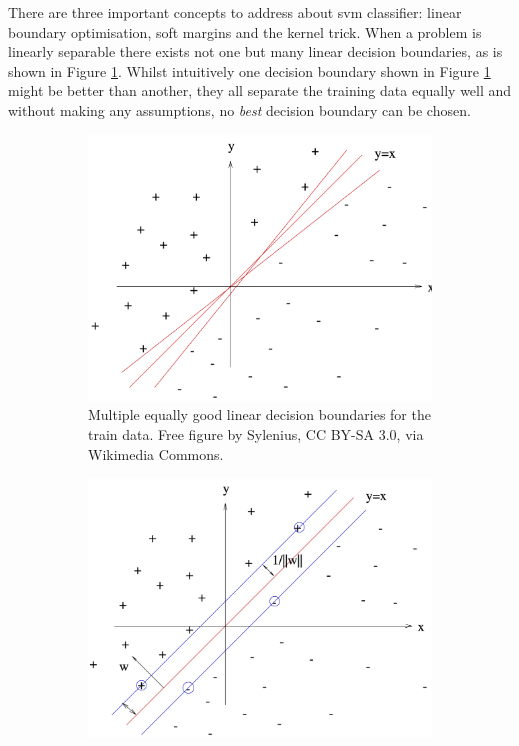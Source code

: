 There are three important concepts to address about \gls{svm} classifier: linear boundary optimisation, soft margins and the kernel trick.
When a problem is linearly separable there exists not one but many linear decision boundaries, as is shown in Figure \ref{fig:processing_signals_svm_boundary_multiple}.
Whilst intuitively one decision boundary shown in Figure \ref{fig:processing_signals_svm_boundary_multiple} might be better than another, they all separate the training data equally well and without making any assumptions, no \textit{best} decision boundary can be chosen.

\begin{figure}[t]
    \centering
    \begin{subfigure}{0.45\textwidth}
        \centering
        \includegraphics[width=\textwidth]{../images/pipeline/svm_multiple_boundaries.pdf}
        \captionsetup{width=\linewidth}
        \captionsetup{justification=centering}
        \caption{Multiple equally good linear decision boundaries for the train data. Free figure by Sylenius, CC BY-SA 3.0, via Wikimedia Commons.}
        \label{fig:processing_signals_svm_boundary_multiple}
    \end{subfigure}
    \hfill
    \begin{subfigure}{0.45\textwidth}
        \centering
        \includegraphics[width=\textwidth]{../images/pipeline/svm_best_boundary.pdf}

\end{subfigure}
\end{figure}
